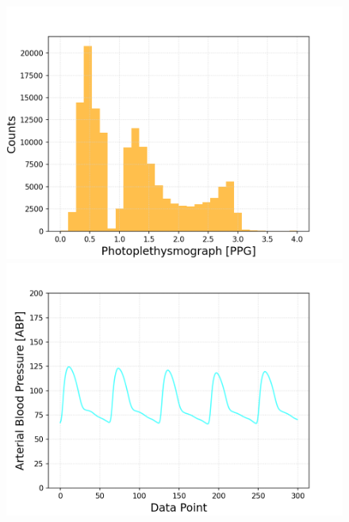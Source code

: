 \documentclass{article}
\begin{document}
\begin{figure}[h!]
\begin{minipage}[b]{0.32\textwidth}
	\end{minipage}
	\begin{minipage}[b]{0.32\textwidth}
		\includegraphics[width=\textwidth]{plots/histo_PPG.png}

	\end{minipage}
	\begin{minipage}[b]{0.32\textwidth}
		\includegraphics[width=\textwidth]{plots/series_ABP_zoom.png}


\end{minipage}
\end{figure}
\end{document}
